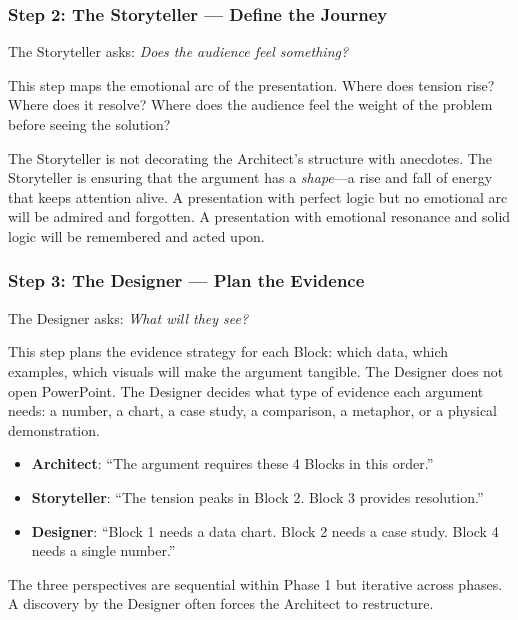 \subsubsection{Step 2: The Storyteller --- Define the Journey}

The Storyteller asks: \emph{Does the audience feel something?}

This step maps the emotional arc of the presentation. Where does tension rise? Where does it resolve? Where does the audience feel the weight of the problem before seeing the solution?

The Storyteller is not decorating the Architect's structure with anecdotes. The Storyteller is ensuring that the argument has a \emph{shape}---a rise and fall of energy that keeps attention alive. A presentation with perfect logic but no emotional arc will be admired and forgotten. A presentation with emotional resonance and solid logic will be remembered and acted upon.

\subsubsection{Step 3: The Designer --- Plan the Evidence}

The Designer asks: \emph{What will they see?}

This step plans the evidence strategy for each Block: which data, which examples, which visuals will make the argument tangible. The Designer does not open PowerPoint. The Designer decides what type of evidence each argument needs: a number, a chart, a case study, a comparison, a metaphor, or a physical demonstration.

\begin{keybox}
\begin{itemize}[leftmargin=1.2em]
  \item \textbf{Architect}: ``The argument requires these 4 Blocks in this order.''
  \item \textbf{Storyteller}: ``The tension peaks in Block 2. Block 3 provides resolution.''
  \item \textbf{Designer}: ``Block 1 needs a data chart. Block 2 needs a case study. Block 4 needs a single number.''
\end{itemize}
The three perspectives are sequential within Phase 1 but iterative across phases. A discovery by the Designer often forces the Architect to restructure.
\end{keybox}

